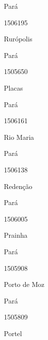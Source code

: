 \documentclass[
  letterpaper,
]{report}
\begin{document}
\n      

Pará

\n      

1506195

\n      

Rurópolis

\n    

\n    

\n      

Pará

\n      

1505650

\n      

Placas

\n    

\n    

\n      

Pará

\n      

1506161

\n      

Rio Maria

\n    

\n    

\n      

Pará

\n      

1506138

\n      

Redenção

\n    

\n    

\n      

Pará

\n      

1506005

\n      

Prainha

\n    

\n    

\n      

Pará

\n      

1505908

\n      

Porto de Moz

\n    

\n    

\n      

Pará

\n      

1505809

\n      

Portel
\end{document}
